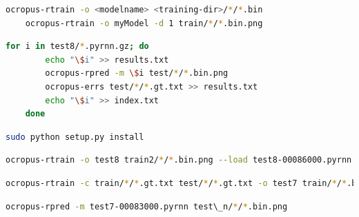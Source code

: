\documentclass{article}
\begin{document}
\begin{lstlisting}[language=bash]
    ocropus-rtrain -o <modelname> <training-dir>/*/*.bin
    ocropus-rtrain -o myModel -d 1 train/*/*.bin.png
\end{lstlisting}

\begin{lstlisting}[language=bash]
    for i in test8/*.pyrnn.gz; do
        echo "\$i" >> results.txt
        ocropus-rpred -m \$i test/*/*.bin.png
        ocropus-errs test/*/*.gt.txt >> results.txt
        echo "\$i" >> index.txt
    done
\end{lstlisting}

\begin{lstlisting}[language=bash]
    sudo python setup.py install
\end{lstlisting}

\begin{lstlisting}[language=bash]
    ocropus-rtrain -o test8 train2/*/*.bin.png --load test8-00086000.pyrnn
\end{lstlisting}

\begin{lstlisting}[language=bash]
    ocropus-rtrain -c train/*/*.gt.txt test/*/*.gt.txt -o test7 train/*/*.bin.png --load test7-00073000.pyrnn
\end{lstlisting}

\begin{lstlisting}[language=bash]
    ocropus-rpred -m test7-00083000.pyrnn test\_n/*/*.bin.png
\end{lstlisting}
\end{document}
